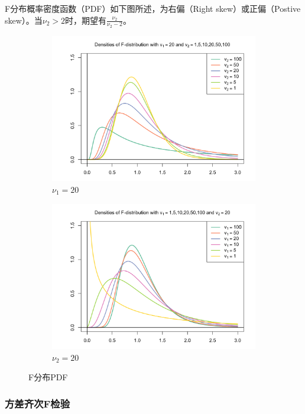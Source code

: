 \documentclass[11pt]{article}
\begin{document}
F分布概率密度函数（PDF）如下图所述，为右偏（Right skew）或正偏（Postive skew）。当$\nu_2>2$时，期望有$\frac{\nu_2}{\nu_2 -2}$。
\begin{figure}
\centering
\begin{subfigure}{.5\textwidth}
    \centering
    \includegraphics[width=\linewidth]{fig/f-dist-1.png}
    \caption{$\nu_1=20$}
\end{subfigure}%
\begin{subfigure}{.5\textwidth}
    \centering
    \includegraphics[width=\linewidth]{fig/f-dist-2.png}
    \caption{$\nu_2=20$}
\end{subfigure}
\caption{F分布PDF}
\label{fig:f-dist}
\end{figure}

\subsubsection{方差齐次F检验}
\end{document}
